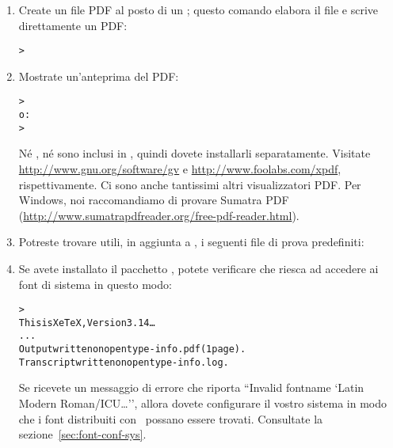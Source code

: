 \documentclass{article}
\begin{document}
\begin{enumerate}
\item Create un file PDF al posto di un \dvi{}; questo comando
elabora il file  e scrive direttamente un PDF:
\begin{alltt}
> 
\end{alltt}

\item Mostrate un'anteprima del PDF:
\begin{alltt}
> 
\textrm{o:}
> 
\end{alltt}
Né , né  sono inclusi in \TL{}, quindi dovete
installarli separatamente. Visitate \url{http://www.gnu.org/software/gv} e
\url{http://www.foolabs.com/xpdf}, rispettivamente. Ci sono anche tantissimi
altri visualizzatori PDF. Per Windows, noi raccomandiamo di provare
Sumatra PDF (\url{http://www.sumatrapdfreader.org/free-pdf-reader.html}).

\item Potreste trovare utili, in aggiunta a , i
seguenti file di prova predefiniti:


\item Se avete installato il pacchetto , potete verificare che
riesca ad accedere ai font di sistema in questo modo:
\begin{alltt}
> 
This is XeTeX, Version 3.14\dots
...
Output written on opentype-info.pdf (1 page).
Transcript written on opentype-info.log.
\end{alltt}

Se ricevete un messaggio di errore che riporta ``Invalid fontname `Latin
Modern Roman/ICU\dots'', allora dovete configurare il vostro sistema in
modo che i font distribuiti con \TL\ possano essere trovati. Consultate la
sezione~\ref{sec:font-conf-sys}.

\end{enumerate}
\end{document}
